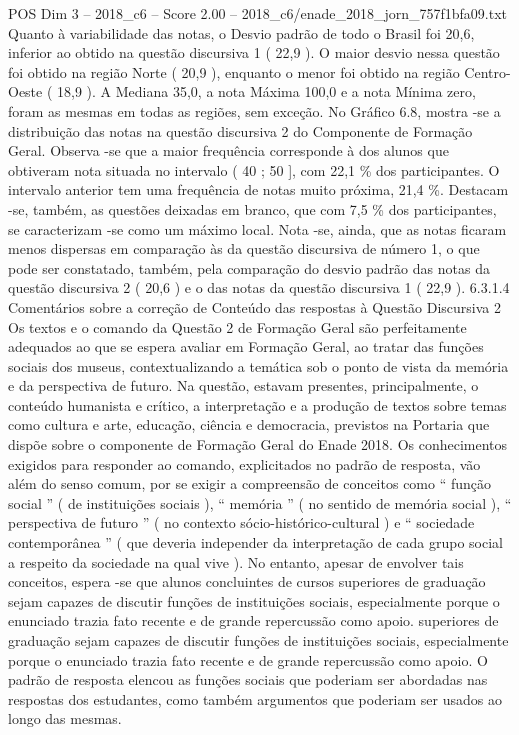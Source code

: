 \begin{textsample}{POS Dim 3 – 2018\_c6 – Score 2.00 – 2018\_c6/enade\_2018\_jorn\_757f1bfa09.txt}
Quanto à variabilidade das notas, o Desvio padrão de todo o Brasil foi 20,6, inferior ao obtido na questão discursiva 1 ( 22,9 ).
O maior desvio nessa questão foi obtido na região Norte ( 20,9 ), enquanto o menor foi obtido na região Centro-Oeste ( 18,9 ).
A Mediana 35,0, a nota Máxima 100,0 e a nota Mínima zero, foram as mesmas em todas as regiões, sem exceção.
No Gráfico 6.8, mostra -se a distribuição das notas na questão discursiva 2 do Componente de Formação Geral.
Observa -se que a maior frequência corresponde à dos alunos que obtiveram nota situada no intervalo ( 40 ; 50 ], com 22,1 \% dos participantes.
O intervalo anterior tem uma frequência de notas muito próxima, 21,4 \%.
Destacam -se, também, as questões deixadas em branco, que com 7,5 \% dos participantes, se caracterizam -se como um máximo local.
Nota -se, ainda, que as notas ficaram menos dispersas em comparação às da questão discursiva de número 1, o que pode ser constatado, também, pela comparação do desvio padrão das notas da questão discursiva 2 ( 20,6 ) e o das notas da questão discursiva 1 ( 22,9 ). 6.3.1.4 Comentários sobre a correção de Conteúdo das respostas à Questão Discursiva 2 Os textos e o comando da Questão 2 de Formação Geral são perfeitamente adequados ao que se espera avaliar em Formação Geral, ao tratar das funções sociais dos museus, contextualizando a temática sob o ponto de vista da memória e da perspectiva de futuro.
Na questão, estavam presentes, principalmente, o conteúdo humanista e crítico, a interpretação e a produção de textos sobre temas como cultura e arte, educação, ciência e democracia, previstos na Portaria que dispõe sobre o componente de Formação Geral do Enade 2018.
Os conhecimentos exigidos para responder ao comando, explicitados no padrão de resposta, vão além do senso comum, por se exigir a compreensão de conceitos como “ função social ” ( de instituições sociais ), “ memória ” ( no sentido de memória social ), “ perspectiva de futuro ” ( no contexto sócio-histórico-cultural ) e “ sociedade contemporânea ” ( que deveria independer da interpretação de cada grupo social a respeito da sociedade na qual vive ).
No entanto, apesar de envolver tais conceitos, espera -se que alunos concluintes de cursos superiores de graduação sejam capazes de discutir funções de instituições sociais, especialmente porque o enunciado trazia fato recente e de grande repercussão como apoio. superiores de graduação sejam capazes de discutir funções de instituições sociais, especialmente porque o enunciado trazia fato recente e de grande repercussão como apoio.
O padrão de resposta elencou as funções sociais que poderiam ser abordadas nas respostas dos estudantes, como também argumentos que poderiam ser usados ao longo das mesmas.

\end{textsample}
